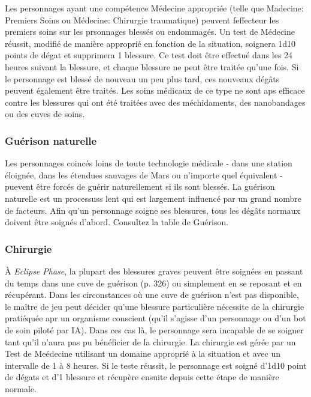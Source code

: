 Les personnages ayant une compétence Médecine appropriée (telle que Madecine: Premiers Soins ou Médecine: Chirurgie traumatique) peuvent feffecteur les premiers soins sur les prsonnages blessés ou endommagés. Un test de Médecine réussit, modifié de manière approprié en fonction de la situation, soignera 1d10 points de dégat et supprimera 1 blessure. Ce test doit être effectué dans les 24 heures suivant la blessure, et chaque blessure ne peut être traitée qu'une fois. Si le personnage est blessé de nouveau un peu plus tard, ces nouveaux dégâts peuvent également être traités. Les soins médicaux de ce type ne sont aps efficace contre les blessures qui ont été traitées avec des méchidaments, des nanobandages ou des cuves de soins. 

\subsubsection{Guérison naturelle} 

Les personnages coincés loins de toute technologie médicale - dans une station éloignée, dans les étendues sauvages de Mars ou n'importe quel équivalent - puevent être forcés de guérir naturellement si ils sont blessés. La guérison naturelle est un processuss lent qui est largement influencé par un grand nombre de facteurs. Afin qu'un personnage soigne ses blessures, tous les dégâts normaux doivent être soignés d'abord. Consultez la table de Guérison. 

\subsubsection{Chirurgie} 

À \emph{Eclipse Phase}, la plupart des blessures graves peuvent être soignées en passant du temps dans une cuve de guérison (p. 326) ou simplement en se reposant et en récupérant. Dans les circonstances où une cuve de guérison n'est pas disponible, le maître de jeu peut décider qu'une blessure particulière nécessite de la chirurgie pratiéquée apr un organisme conscient (qu'il s'agisse d'un personnage ou d'un bot de soin piloté par IA). Dans ces cas là, le personnage sera incapable de se soigner tant qu'il n'aura pas pu bénéficier de la chirurgie. La chirurgie est gérée par un Test de Meédecine utilisant un domaine approprié à la situation et avec un intervalle de 1 à 8 heures. Si le teste réussit, le personnage est soigné d'1d10 point de dégats et d'1 blessure et récupère ensuite depuis cette étape de manière normale. 

